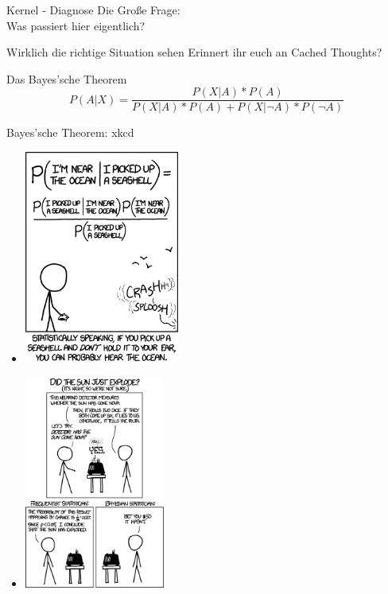 \begin{frame}[c]{Kernel - Diagnose}
    \Huge
    Die Große Frage: \\
    \pause
    Was passiert hier eigentlich?
\end{frame}


\begin{frame}[c]{Wirklich die richtige Situation sehen}
    \Huge
    Erinnert ihr euch an Cached Thoughts?
\end{frame}


\begin{frame}[c]{Das Bayes'sche Theorem}
    \Large
    \[
        P(A|X) = \frac{P(X|A) * P(A)}{P(X|A) * P(A) + P(X|\neg A) * P(\neg A)}
    \]
\end{frame}


\begin{frame}[c]{Bayes'sche Theorem: xkcd}
    \begin{multicols}{2}
    \begin{itemize}
        \item[]<1> \includegraphics[height=7cm]{xkcd_seashell.png}
        \item[]<2> \includegraphics[height=7cm]{xkcd_frequentists_vs_bayesians.png}
    \end{itemize}
    \end{multicols}
\end{frame}


